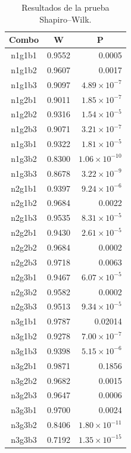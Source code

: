 \documentclass{article}
\begin{document}
\newpage

\begin{table}[h!]
\centering
\caption{Resultados de la prueba Shapiro–Wilk.}
\label{tabla5}
\begin{tabular}{|c|r|r|}
\hline
Combo & \multicolumn{1}{c|}{W} & \multicolumn{1}{c|}{P} \\ \hline
n1g1b1 & 0.9552 & 0.0005 \\ \hline
n1g1b2 & 0.9607 & 0.0017 \\ \hline
n1g1b3 & 0.9097 & $4.89\times 10^{-7}$  \\ \hline
n1g2b1 & 0.9011 & $1.85\times 10^{-7}$  \\ \hline
n1g2b2 & 0.9316 & $1.54\times 10^{-5}$ \\ \hline
n1g2b3 & 0.9071 & $3.21\times 10^{-7}$ \\ \hline
n1g3b1 & 0.9322 & $1.81\times 10^{-5}$ \\ \hline
n1g3b2 & 0.8300 & $1.06\times 10^{-10}$ \\ \hline
n1g3b3 & 0.8678 & $3.22\times 10^{-9}$ \\ \hline
n2g1b1 & 0.9397 & $9.24\times 10^{-6}$ \\ \hline
n2g1b2 & 0.9684 & 0.0022 \\ \hline
n2g1b3 & 0.9535 & $8.31\times 10^{-5}$ \\ \hline
n2g2b1 & 0.9430 & $2.61\times 10^{-5}$ \\ \hline
n2g2b2 & 0.9684 & 0.0002 \\ \hline
n2g2b3 & 0.9718 & 0.0063 \\ \hline
n2g3b1 & 0.9467 & $6.07\times 10^{-5}$ \\ \hline
n2g3b2 & 0.9582 & 0.0002 \\ \hline
n2g3b3 & 0.9513 & $9.34\times 10^{-5}$ \\ \hline
n3g1b1 & 0.9787 & 0.02014 \\ \hline
n3g1b2 & 0.9278 & $7.00\times 10^{-7}$ \\ \hline
n3g1b3 & 0.9398 & $5.15\times 10^{-6}$ \\ \hline
n3g2b1 & 0.9871 & 0.1856 \\ \hline
n3g2b2 & 0.9682 & 0.0015 \\ \hline
n3g2b3 & 0.9647 & 0.0006 \\ \hline
n3g3b1 & 0.9700 & 0.0024 \\ \hline
n3g3b2 & 0.8406 & $1.80\times 10^{-11}$ \\ \hline
n3g3b3 & 0.7192 & $1.35\times 10^{-15}$ \\ \hline
\end{tabular}
\end{table}
\end{document}
